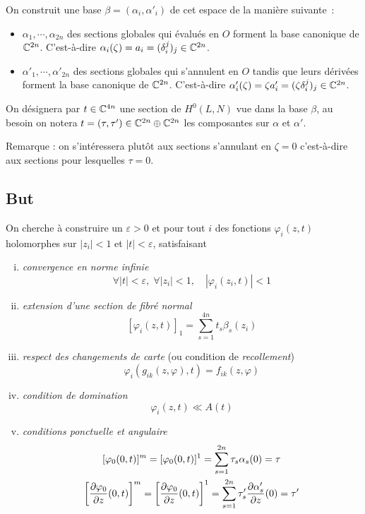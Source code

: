 \documentclass[a4paper,10pt,draft,makeidx,twocolumn]{amsart}
\begin{document}
On construit une base $\beta = (\alpha_i, \alpha'_i)$ de cet espace de la manière suivante~:
\begin{itemize}
\item $\alpha_1, \cdots, \alpha_{2n}$ des sections globales qui évalués en $O$ forment la base canonique de $\mathbb{C}^{2n}$.
C'est-à-dire $\alpha_i(\zeta) = a_i = (\delta_i^j)_j \in \mathbb{C}^{2n}$. 
\item $\alpha'_1, \cdots, \alpha'_{2n}$ des sections globales qui s'annulent en $O$ tandis que leurs dérivées forment la base canonique de $\mathbb{C}^{2n}$.
C'est-à-dire $\alpha'_i(\zeta) = \zeta a'_i = (\zeta \delta_i^j)_j \in \mathbb{C}^{2n}$. 
\end{itemize}

On désignera par $t \in \mathbb{C}^{4n}$ une section de $H^0(L,N)$ vue dans la base $\beta$, au besoin on notera $t = (\tau, \tau') \in \mathbb{C}^{2n} \oplus \mathbb{C}^{2n}$ les composantes sur $\alpha$ et $\alpha'$.

Remarque : on s’intéressera plutôt aux sections s'annulant en $\zeta = 0$ c'est-à-dire aux sections pour lesquelles $\tau = 0$.

\subsection{But}
On cherche à construire un $\varepsilon>0$ et pour tout $i$ des fonctions $\varphi_i(z,t)$ holomorphes sur $|z_i| < 1$ et $|t|<\varepsilon$, satisfaisant
\begin{enumerate}[(i)]
\item \emph{convergence en norme infinie}\label{CVinfty}
\[
\forall |t| < \varepsilon,\; \forall |z_i| < 1, \quad  | \varphi_i(z_i,t) | < 1
\]
\item \emph{extension d'une section de fibré normal}\label{Initialisation}
\[
[\varphi_i(z,t)]_1 = \sum_{s=1}^{4n} t_s \beta_s(z_i)
\]
\item \emph{respect des changements de carte} (ou condition de \emph{recollement})\label{Recollement}
\[
\varphi_i(g_{ik}(z,\varphi),t) = f_{ik}(z, \varphi)
\]
\item \emph{condition de domination}\label{Domination}
\[
\varphi_i(z,t) \ll A(t)
\]
\item \emph{conditions ponctuelle et angulaire}\label{Pt-Ang}
\begin{subequations}
\begin{gather}
	[\varphi_0(0,t)]^m = [\varphi_0(0,t)]^1  = \sum_{s=1}^{2n} \tau_s \alpha_s(0) = \tau\label{E:Pt}\\
	\left[\dfrac{\partial{\varphi_0}}{\partial{z}}(0,t)\right]^m = \left[\dfrac{\partial{\varphi_0}}{\partial{z}}(0,t)\right]^1  = \sum_{s=1}^{2n} \tau'_s \dfrac{\partial{\alpha'_s}}{\partial{z}}(0) = \tau' \label{E:Ang}
\end{gather}
\end{subequations}
\end{enumerate}
\end{document}

